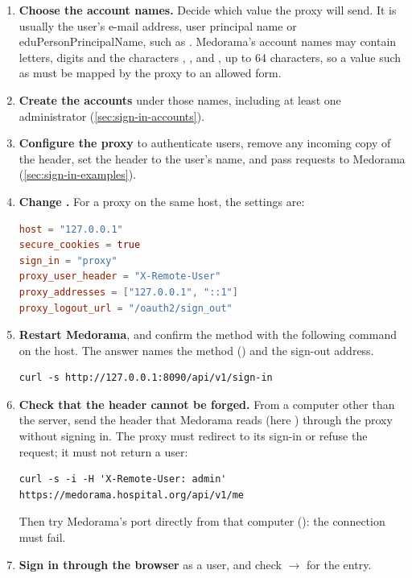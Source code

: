 \begin{enumerate}
\item \textbf{Choose the account names.} Decide which value the proxy will send. It is usually
  the user's e-mail address, user principal name or eduPersonPrincipalName, such as
  . Medorama's account names may contain letters, digits and the
  characters , \code{\_}, \code{-} and , up to 64 characters, so a value such as
   must be mapped by the proxy to an allowed form.
\item \textbf{Create the accounts} under those names, including at least one administrator
  (\cref{sec:sign-in-accounts}).
\item \textbf{Configure the proxy} to authenticate users, remove any incoming copy of the
  header, set the header to the user's name, and pass requests to Medorama
  (\cref{sec:sign-in-examples}).
\item \textbf{Change .} For a proxy on the same host, the settings are:
\begin{lstlisting}[language=TOML]
host = "127.0.0.1"
secure_cookies = true
sign_in = "proxy"
proxy_user_header = "X-Remote-User"
proxy_addresses = ["127.0.0.1", "::1"]
proxy_logout_url = "/oauth2/sign_out"
\end{lstlisting}
\item \textbf{Restart Medorama}, and confirm the method with the following command on the
  host. The answer names the method () and the sign-out address.
\begin{lstlisting}[style=shell]
curl -s http://127.0.0.1:8090/api/v1/sign-in
\end{lstlisting}
\item \textbf{Check that the header cannot be forged.} From a computer other than the server,
  send the header that Medorama reads (here ) through the proxy without
  signing in. The proxy must redirect to its sign-in or refuse the request; it must not return a
  user:
\begin{lstlisting}[style=shell]
curl -s -i -H 'X-Remote-User: admin' https://medorama.hospital.org/api/v1/me
\end{lstlisting}
  Then try Medorama's port directly from that computer (): the
  connection must fail.
\item \textbf{Sign in through the browser} as a user, and check  $\rightarrow$
   for the  entry.
\end{enumerate}

